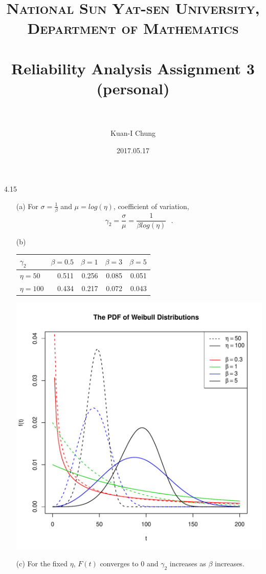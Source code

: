 \documentclass[paper=a4, fontsize=12pt]{scrartcl} %
\title{	
\normalfont \normalsize 
\textsc{National Sun Yat-sen University, Department of Mathematics} \\ [25pt] %
\horrule{0.5pt} \\[0.4cm] %
\huge Reliability Analysis Assignment 3 \\(personal)\\ %
\horrule{2pt} \\[0.5cm] %
}
\author{Kuan-I Chung} %
\date{\normalsize 2017.05.17} %
\numberwithin{equation}{section} %
\numberwithin{figure}{section} %
\numberwithin{table}{section} %
\begin{document}
\maketitle %

4.15
\begin{itemize}

\item[(a)]	For $\sigma = \frac{1}{\beta}$ and $\mu = log(\eta)$, coefficient of variation, $$\gamma_2 = \frac{\sigma}{\mu} = \frac{1}{\beta log(\eta)}\ \ \ .$$

\item[(b)] 	\ \\
		\begin{tabular}{l | rrrr}
		$\gamma_2$	&	$\beta = 0.5$	&	$\beta = 1$	&	$\beta = 3$	&	$\beta = 5$\\
		\hline
		$\eta =50$ 	&	0.511 		&	0.256 		&	0.085 		&	0.051\\
		$\eta =100$ 	&	0.434 		&	0.217 		&	0.072 		&	0.043
		\end{tabular}
		
		\includegraphics[width = \textwidth]{f_4_15_b.pdf}
\item[(c)]	For the fixed $\eta$, $F(t)$ converges to $0$ and $\gamma_2$ increases as $\beta$ increases.
\end{itemize}
\end{document}
